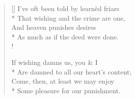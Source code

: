 \documentclass[MAIN]{subfiles}
\begin{document}
\settowidth{\versewidth}{I've oft been told by learned friars}
\begin{verse}[\versewidth]
I've oft been told by learn\`ed friars\\*
\vin That wishing and the crime are one,\\
And heaven punishes desires\\*
\vin As much as if the deed were done.\\!

If wishing damns us, you \& I\\*
\vin Are damned to all our heart's content;\\
Come, then, at least we may enjoy\\*
\vin Some pleasure for our punishment.
\end{verse}
\end{document}
